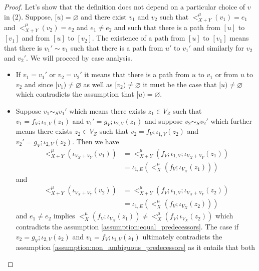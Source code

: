 \begin{proof}
    Let's show that the definition does not depend on a particular choice of $v$ in (2).
    Suppose, $[u) = \varnothing$ and there exist $v_1$ and $v_2$ such that $<_{X+Y}^{\mu}(v_1) = e_1$ and $<_{X+Y}^{\mu}(v_2) = e_2$ and $e_1 \not = e_2$ and such that there is a path from $[u]$ to $[v_1]$ and from $[u]$ to $[v_2]$.
    The existence of a path from $[u]$ to $[v_1]$ means that there is $v_1' \sim v_1$ such that there is a path from $u'$ to $v_1'$ and similarly for $v_2$ and $v_2'$.
    We will proceed by case analysis.
    \begin{itemize}
            \item If $v_1 = v_1'$ or $v_2 = v_2'$ it means that there is a path from $u$ to $v_1$ or from $u$ to $v_2$ and since $[v_1) \not = \varnothing$ as well as $[v_2) \not = \varnothing$ it must be the case that $[u) \not = \varnothing$ which contradicts the assumption that $[u) = \varnothing$.
            \item Suppose $v_1 \sim_{S} v_1'$ which means there exists $z_1 \in V_{Z}$ such that $v_1 = f_{V};\iota_{1,V}(z_1)$ and $v_1' = g_{V};\iota_{2,V}(z_1)$ and suppose $v_2 \sim_{S} v_2'$ which further means there exists $z_2 \in V_{Z}$ such that $v_2 = f_{V};\iota_{1,V}(z_2)$ and $v_2' = g_{V};\iota_{2,V}(z_2)$.
                  Then we have
                  \begin{align*}
                    <_{X+Y}^{\mu}(\iota_{V_{X} + V_{Y}}(v_1)) &= <_{X+Y}^{\mu}(f_{V};\iota_{1,V};\iota_{V_{X} + V_{Y}}(z_1))\\
                                                              &= \iota_{1,E}(<_{X}^{\mu}(f_{V};\iota_{V_{X}}(z_1)))
                \end{align*}
                  and
                  \begin{align*}
                    <_{X+Y}^{\mu}(\iota_{V_{X} + V_{Y}}(v_2)) &= <_{X+Y}^{\mu}(f_{V};\iota_{1,V};\iota_{V_{X} + V_{Y}}(z_2))\\
                                                              &= \iota_{1,E}(<_{X}^{\mu}(f_{V};\iota_{V_{X}}(z_2)))
                \end{align*}
                and $e_1 \not = e_2$ implies $<_{X}^{\mu}(f_{V};\iota_{V_{X}}(z_1)) \not = <_{X}^{\mu}(f_{V};\iota_{V_{X}}(z_2))$ which contradicts the assumption \ref{assumption:equal_predecessors}.
                The case if $v_2 = g_{V};\iota_{2,V}(z_2)$ and $v_1 = f_{V};\iota_{1,V}(z_1)$ ultimately contradicts the assumption \ref{assumption:non_ambiguous_predecessors} as it entails that both
                \[
\]
\end{itemize}
\end{proof}
